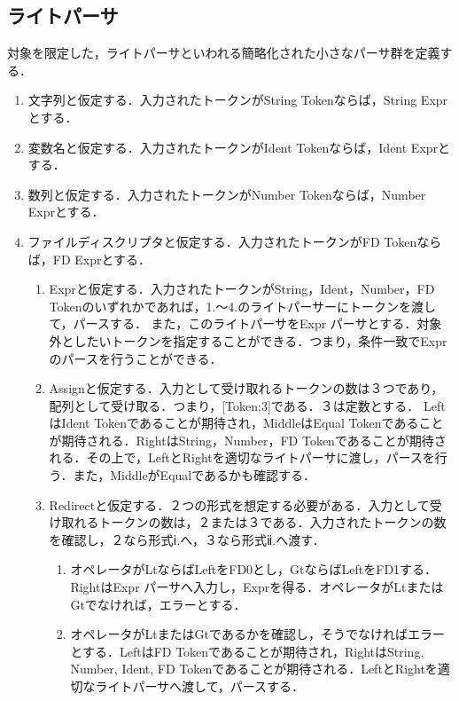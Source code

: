 \documentclass{article}
\begin{document}
\subsection{ライトパーサ}
対象を限定した，ライトパーサといわれる簡略化された小さなパーサ群を定義する．

\begin{enumerate}
    \item 文字列と仮定する．入力されたトークンがString Tokenならば，String Exprとする．
    \item 変数名と仮定する．入力されたトークンがIdent Tokenならば，Ident Exprとする．
    \item 数列と仮定する．入力されたトークンがNumber Tokenならば，Number Exprとする．
    \item ファイルディスクリプタと仮定する．入力されたトークンがFD Tokenならば，FD Exprとする．
    \begin{enumerate}
        \item Exprと仮定する．入力されたトークンがString，Ident，Number，FD Tokenのいずれかであれば，1.〜4.のライトパーサーにトークンを渡して，パースする．\newline
        また，このライトパーサをExpr パーサとする．対象外としたいトークンを指定することができる．つまり，条件一致でExprのパースを行うことができる．
        \item Assignと仮定する．入力として受け取れるトークンの数は３つであり，配列として受け取る．つまり，[Token;3]である．３は定数とする．\newline
        LeftはIdent Tokenであることが期待され，MiddleはEqual Tokenであることが期待される．RightはString，Number，FD Tokenであることが期待される．その上で，LeftとRightを適切なライトパーサに渡し，パースを行う．また，MiddleがEqualであるかも確認する．
        \item Redirectと仮定する．２つの形式を想定する必要がある．入力として受け取れるトークンの数は，２または３である．入力されたトークンの数を確認し，２なら形式ⅰ.へ，３なら形式ⅱ.へ渡す．
        \begin{enumerate}
            \item オペレータがLtならばLeftをFD0とし，GtならばLeftをFD1する．RightはExpr パーサへ入力し，Exprを得る．オペレータがLtまたはGtでなければ，エラーとする．
            \item オペレータがLtまたはGtであるかを確認し，そうでなければエラーとする．LeftはFD Tokenであることが期待され，RightはString, Number, Ident, FD Tokenであることが期待される．LeftとRightを適切なライトパーサへ渡して，パースする．
        \end{enumerate}

\end{enumerate}
\end{enumerate}
\end{document}
